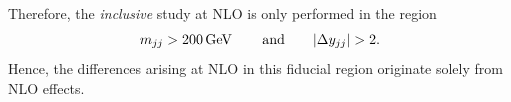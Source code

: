 Therefore, the \emph{inclusive} study at NLO is only performed in the region 
%
\begin{equation}
\label{eq:inclusive}
	m_{jj} > 200\,\text{GeV}\, \qquad {\rm and} \qquad |\Delta y_{jj}| > 2 .
\end{equation}
%
Hence, the differences arising at NLO in this fiducial region originate solely from NLO effects.

%
